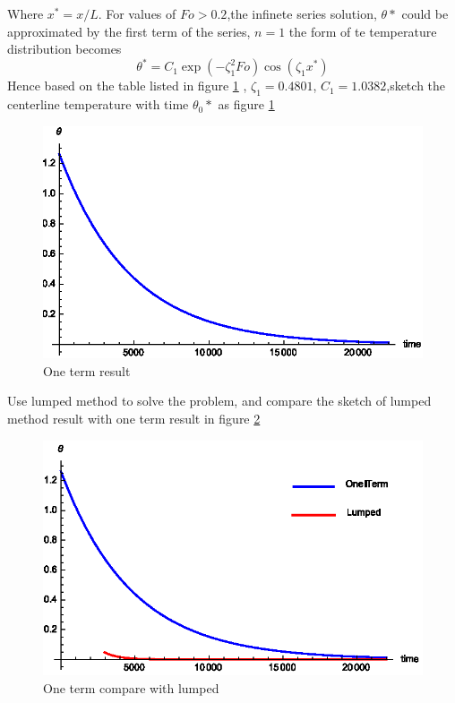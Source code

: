 \begin{solution}
Where $x^*=x/L$.
For values of $Fo>0.2$,the infinete series solution, $\theta*$ could be approximated by the first term of the series, $n=1$
the form of te temperature distribution becomes
$$\theta^*=C_1\exp(-\zeta^2_1Fo)\cos(\zeta_1x^*)$$
Hence based on the table listed in figure \ref{fig:4:10} , $\zeta_{1}=0.4801$, $C_1=1.0382$,sketch the centerline temperature with time $\theta_0*$ as figure \ref{fig:4:10}
\begin{figure}[H]
  \centering
    \includegraphics[scale=1]{figures/ch4/10}
    \caption{One term result}
    \label{fig:4:10}
\end{figure}
Use lumped method to solve the problem, and compare the sketch of lumped method result with one term result in figure \ref{fig:4:11}
\begin{figure}[H]
  \centering
    \includegraphics[scale=1]{figures/ch4/11}
    \caption{One term compare with lumped}
    \label{fig:4:11}
\end{figure}
\end{solution}




